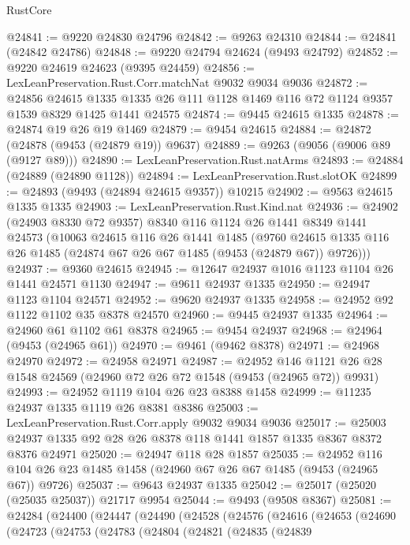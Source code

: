 \begin{lexlean}{RustCore}
\begin{coremodule}
@24841 := @9220 @24830 @24796
@24842 := @9263 @24310
@24844 := @24841 (@24842 @24786)
@24848 := @9220 @24794 @24624 (@9493 @24792)
@24852 := @9220 @24619 @24623 (@9395 @24459)
@24856 := LexLeanPreservation.Rust.Corr.matchNat @9032 @9034 @9036
@24872 := @24856
    @24615
    @1335
    @1335
    @26
    @111
    @1128
    @1469
    @116
    @72
    @1124
    @9357
    @1539
    @8329
    @1425
    @1441
    @24575
@24874 := @9445 @24615 @1335
@24878 := @24874 @19 @26 @19 @1469
@24879 := @9454 @24615
@24884 := @24872 (@24878 (@9453 (@24879 @19)) @9637)
@24889 := @9263 (@9056 (@9006 @89 (@9127 @89)))
@24890 := LexLeanPreservation.Rust.natArms
@24893 := @24884 (@24889 (@24890 @1128))
@24894 := LexLeanPreservation.Rust.slotOK
@24899 := @24893 (@9493 (@24894 @24615 @9357)) @10215
@24902 := @9563 @24615 @1335 @1335
@24903 := LexLeanPreservation.Rust.Kind.nat
@24936 := @24902
    (@24903 @8330 @72 @9357)
    @8340
    @116
    @1124
    @26
    @1441
    @8349
    @1441
    @24573
    (@10063
      @24615
      @116
      @26
      @1441
      @1485
      (@9760 @24615 @1335 @116 @26 @1485 (@24874 @67 @26 @67 @1485 (@9453 (@24879 @67)) @9726)))
@24937 := @9360 @24615
@24945 := @12647 @24937 @1016 @1123 @1104 @26 @1441 @24571 @1130
@24947 := @9611 @24937 @1335
@24950 := @24947 @1123 @1104 @24571
@24952 := @9620 @24937 @1335
@24958 := @24952 @92 @1122 @1102 @35 @8378 @24570
@24960 := @9445 @24937 @1335
@24964 := @24960 @61 @1102 @61 @8378
@24965 := @9454 @24937
@24968 := @24964 (@9453 (@24965 @61))
@24970 := @9461 (@9462 @8378)
@24971 := @24968 @24970
@24972 := @24958 @24971
@24987 := @24952
    @146
    @1121
    @26
    @28
    @1548
    @24569
    (@24960 @72 @26 @72 @1548 (@9453 (@24965 @72)) @9931)
@24993 := @24952 @1119 @104 @26 @23 @8388 @1458
@24999 := @11235 @24937 @1335 @1119 @26 @8381 @8386
@25003 := LexLeanPreservation.Rust.Corr.apply @9032 @9034 @9036
@25017 := @25003 @24937 @1335 @92 @28 @26 @8378 @118 @1441 @1857 @1335 @8367 @8372 @8376 @24971
@25020 := @24947 @118 @28 @1857
@25035 := @24952 @116 @104 @26 @23 @1485 @1458 (@24960 @67 @26 @67 @1485 (@9453 (@24965 @67)) @9726)
@25037 := @9643 @24937 @1335
@25042 := @25017 (@25020 (@25035 @25037)) @21717 @9954
@25044 := @9493 (@9508 @8367)
@25081 := @24284
    (@24400
      (@24447
        (@24490
          (@24528
            (@24576
              (@24616
                (@24653
                  (@24690
                    (@24723
                      (@24753
                        (@24783
                          (@24804
                            (@24821
                              (@24835
                                (@24839

\end{coremodule}
\end{lexlean}
